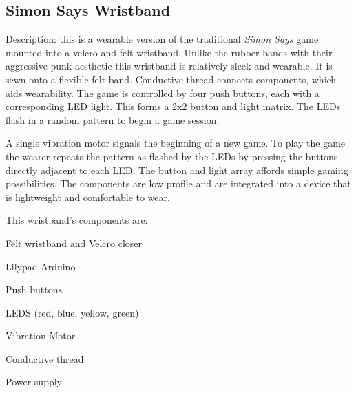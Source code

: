 \documentclass{chi-ext}
\begin{document}
\subsection{Simon Says Wristband}
Description: this is a wearable version of the traditional \emph{Simon Says} game mounted into a velcro and felt wristband. Unlike the rubber bands with their aggressive punk aesthetic this wristband is relatively sleek and wearable. It is sewn onto a flexible felt band. Conductive thread connects components, which aids wearability. The game is controlled by four push buttons, each with a corresponding LED light. This forms a 2x2 button and light matrix. The LEDs flash in a random pattern to begin a game session. 

A single vibration motor signals the beginning of a new game. To play the game the wearer repeats the pattern as flashed by the LEDs by pressing the buttons directly adjacent to each LED. The button and light array affords simple gaming possibilities. The components are low profile and are integrated into a device that is lightweight and comfortable to wear. 

This wristband's components are:
\begin{inparaenum}
\item Felt wristband and Velcro closer
\item Lilypad Arduino
\item Push buttons
\item LEDS (red, blue, yellow, green)
\item Vibration Motor
\item Conductive thread
\item Power supply
\end{inparaenum}

\end{document}
